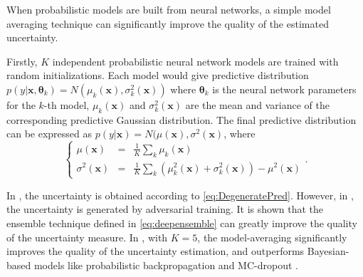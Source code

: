 When probabilistic models are built from neural networks, a simple model averaging technique\cite{lazaro2010marginalized, huang2015scalable, lakshminarayanan2017simple} can significantly improve the quality of the estimated uncertainty.

Firstly, $K$ independent probabilistic neural network models are trained with random initializations. Each model would give predictive distribution $p(y | \bm{x}, \bm{\theta}_k) = N(\mu_k(\bm{x}), \sigma_k^2(\bm{x}))$ where $\bm{\theta}_k$ is the neural network parameters for the $k$-th model, $\mu_k(\bm{x})$ and $\sigma_k^2(\bm{x})$ are the mean and variance of the corresponding predictive Gaussian distribution. The final predictive distribution can be expressed as $p(y | \bm{x}) = N(\mu(\bm{x}), \sigma^2(\bm{x})$, where
\begin{equation}
    \left\{
        \begin{array}{lll}
            \mu(\bm{x})      &=& \frac{1}{K} \sum_k \mu_k(\bm{x}) \\
            \sigma^2(\bm{x}) &=& \frac{1}{K} \sum_k (\mu_k^2(\bm{x}) + \sigma_k^2(\bm{x})) - \mu^2(\bm{x})
        \end{array}.
    \right.
    \label{eq:deepensemble}
\end{equation}

In \cite{lazaro2010marginalized, huang2015scalable}, the uncertainty is obtained according to \eqref{eq:DegeneratePred}. However, in \cite{lakshminarayanan2017simple}, the uncertainty is generated by adversarial training. It is shown that the ensemble technique defined in \eqref{eq:deepensemble} can greatly improve the quality of the uncertainty measure. In \cite{lakshminarayanan2017simple}, with $K = 5$, the model-averaging significantly improves the quality of the uncertainty estimation, and outperforms Bayesian-based models like probabilistic backpropagation \cite{hernandez2015probabilistic} and MC-dropout \cite{gal2016dropout}.
